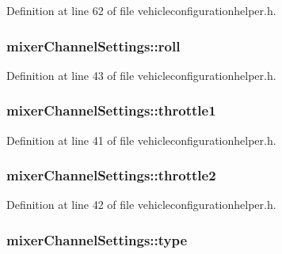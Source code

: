 Definition at line 62 of file vehicleconfigurationhelper.\-h.

\hypertarget{group___vehicle_configuration_helper_ga41061bf67fafdf170291f3a518268645}{
\subsubsection[{roll}]{ mixer\-Channel\-Settings\-::roll}}\label{group___vehicle_configuration_helper_ga41061bf67fafdf170291f3a518268645}


Definition at line 43 of file vehicleconfigurationhelper.\-h.

\hypertarget{group___vehicle_configuration_helper_ga938151d1ab96457978b7689a772b1d2f}{
\subsubsection[{throttle1}]{ mixer\-Channel\-Settings\-::throttle1}}\label{group___vehicle_configuration_helper_ga938151d1ab96457978b7689a772b1d2f}


Definition at line 41 of file vehicleconfigurationhelper.\-h.

\hypertarget{group___vehicle_configuration_helper_gaaa198e94e22ad3c7474bef8972c5e73d}{
\subsubsection[{throttle2}]{ mixer\-Channel\-Settings\-::throttle2}}\label{group___vehicle_configuration_helper_gaaa198e94e22ad3c7474bef8972c5e73d}


Definition at line 42 of file vehicleconfigurationhelper.\-h.

\hypertarget{group___vehicle_configuration_helper_gae266726733ea9753d4b40ababc4ed7dd}{
\subsubsection[{type}]{ mixer\-Channel\-Settings\-::type}}\label{group___vehicle_configuration_helper_gae266726733ea9753d4b40ababc4ed7dd}


